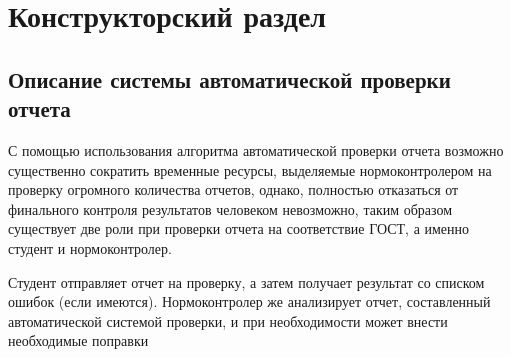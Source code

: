 \chapter{Конструкторский раздел}

\section{Описание системы автоматической проверки отчета}
С помощью использования алгоритма автоматической проверки отчета возможно существенно сократить временные ресурсы, выделяемые нормоконтролером на проверку огромного количества отчетов, однако, полностью отказаться от финального контроля результатов человеком невозможно, таким образом существует две роли при проверки отчета на соответствие ГОСТ, а именно студент и нормоконтролер.

Студент отправляет отчет на проверку, а затем получает результат со списком ошибок (если имеются). Нормоконтролер же анализирует отчет, составленный автоматической системой проверки, и при необходимости может внести необходимые поправки
